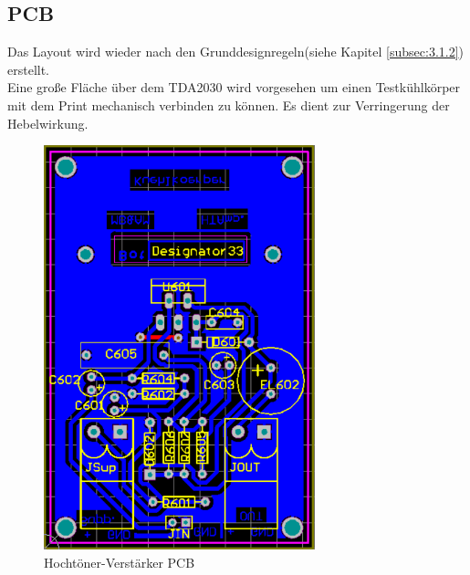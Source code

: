 \subsection{PCB}\label{subsec:4.5.4}
Das Layout wird wieder nach den Grunddesignregeln(siehe Kapitel \ref{subsec:3.1.2}) erstellt.\\
Eine große Fläche über dem TDA2030 wird vorgesehen um einen Testkühlkörper mit dem Print mechanisch verbinden zu können.
Es dient zur Verringerung der Hebelwirkung.

\begin{figure} [H]
	\centering	
	\includegraphics[width=0.7\textwidth]{img/Print6/HTVerstaerker-PCB.PNG}
	\caption{Hochtöner-Verstärker PCB}
	\label {fig:4.5.4.1}
\end{figure}

